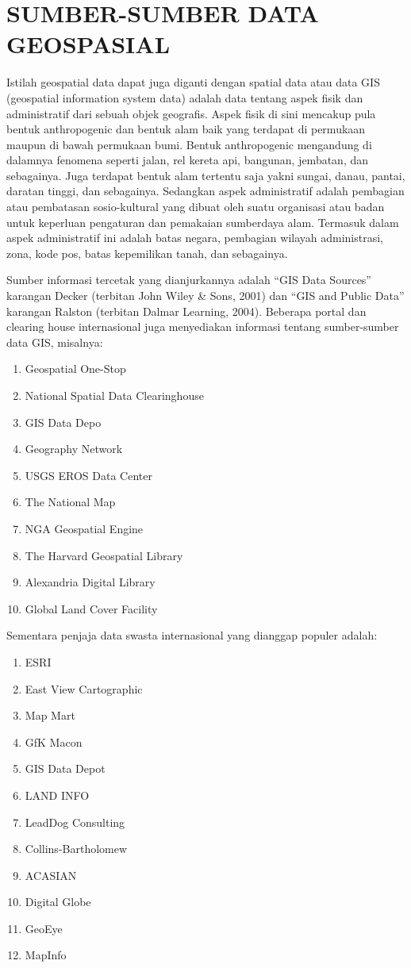 
\section{SUMBER-SUMBER DATA GEOSPASIAL}

Istilah geospatial data dapat juga diganti dengan spatial data atau data GIS (geospatial information system data) adalah data tentang aspek fisik dan administratif dari sebuah objek geografis. Aspek fisik di sini mencakup pula bentuk anthropogenic dan bentuk alam baik yang terdapat di permukaan maupun di bawah permukaan bumi. Bentuk anthropogenic mengandung di dalamnya fenomena seperti jalan, rel kereta api, bangunan, jembatan, dan sebagainya. Juga terdapat bentuk alam tertentu saja yakni sungai, danau, pantai, daratan tinggi, dan sebagainya. Sedangkan aspek administratif adalah pembagian atau pembatasan sosio-kultural yang dibuat oleh suatu organisasi atau badan untuk keperluan pengaturan dan pemakaian sumberdaya alam. Termasuk dalam aspek administratif ini adalah batas negara, pembagian wilayah administrasi, zona, kode pos, batas kepemilikan tanah, dan sebagainya. 

Sumber informasi tercetak yang dianjurkannya adalah “GIS Data Sources” karangan Decker (terbitan John Wiley \& Sons, 2001) dan “GIS and Public Data” karangan Ralston (terbitan Dalmar Learning, 2004). Beberapa portal dan clearing house internasional juga menyediakan informasi tentang sumber-sumber data GIS, misalnya:
\begin{enumerate}
\item Geospatial One-Stop
\item National Spatial Data Clearinghouse
\item GIS Data Depo
\item Geography Network
\item USGS EROS Data Center
\item The National Map
\item NGA Geospatial Engine
\item The Harvard Geospatial Library
\item Alexandria Digital Library
\item Global Land Cover Facility
\end{enumerate}

Sementara penjaja data swasta internasional yang dianggap populer adalah:
\begin{enumerate}
\item ESRI
\item East View Cartographic
\item Map Mart
\item GfK Macon
\item GIS Data Depot
\item LAND INFO
\item LeadDog Consulting
\item Collins-Bartholomew
\item ACASIAN
\item Digital Globe
\item GeoEye
\item MapInfo
\end{enumerate}

